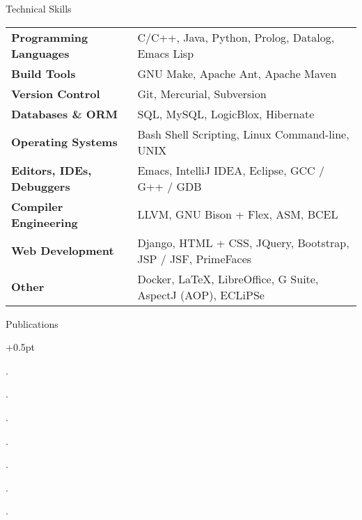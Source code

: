\documentclass{resume}
\begin{document}

\begin{rSection}{Technical Skills}

{\renewcommand{\arraystretch}{1.3}
\begin{tabular}{ @{} >{\bfseries}l @{\hspace{6ex}} l }

Programming Languages
   & C/C++, Java, Python, Prolog, Datalog, Emacs Lisp \\

Build Tools
   & GNU Make, Apache Ant, Apache Maven \\

Version Control
   & Git, Mercurial, Subversion \\

Databases \& ORM
   & SQL, MySQL, LogicBlox, Hibernate \\

Operating Systems
   & Bash Shell Scripting, Linux Command-line, UNIX \\

Editors, IDEs, Debuggers
   & Emacs, IntelliJ IDEA, Eclipse, GCC / G++ / GDB \\

Compiler Engineering
   & LLVM, GNU Bison + Flex, ASM, BCEL \\


Web Development
   & Django, HTML + CSS, JQuery, Bootstrap, JSP / JSF, PrimeFaces \\

Other
   & Docker, \LaTeX{}, LibreOffice, G Suite, AspectJ (AOP), ECLiPSe \\
\end{tabular}}
\end{rSection}


\begin{rSection}{Publications}
  \begin{rSubsection}{}{}{}{}
    \itemsep +0.5pt %
  \item {}.
  \item {}.
  \item {}.
  \item {}.
  \item {}.
  \item {}.
  \item {}.
  \end{rSubsection}
\end{rSection}
\end{document}

